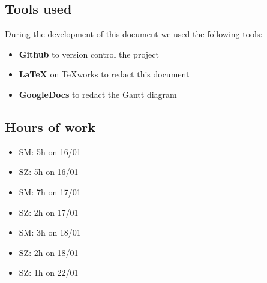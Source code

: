 \documentclass[11pt]{article} %
\begin{document}
\subsection{Tools used}
During the development of this document we used the following tools:
\begin{itemize}
	\item \textbf{Github} to version control the project
	\item \textbf{\LaTeX} on TeXworks to redact this document
	\item \textbf{GoogleDocs} to redact the Gantt diagram
\end{itemize}

\subsection{Hours of work}
\begin{itemize}
	\item SM: 5h on 16/01
	\item SZ: 5h on 16/01
	\item SM: 7h on 17/01
	\item SZ: 2h on 17/01
	\item SM: 3h on 18/01
	\item SZ: 2h on 18/01
	\item SZ: 1h on 22/01
\end{itemize}
\end{document}
